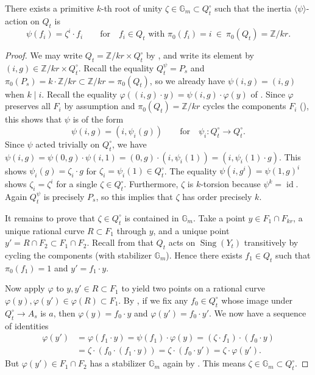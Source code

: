 \documentclass[reqno, letterpaper]{amsart}
\numberwithin{equation}{subsection}
\let\to\longrightarrow
\newcommand{\GG}{\mathbb{G}}
\newcommand{\ZZ}{\mathbb{Z}}
\DeclareMathOperator{\id}{id}
\DeclareMathOperator{\Sing}{Sing}
\begin{document}
			\begin{lemma} \label{lem:classification of multiple fiber iii:psi-action}
				There exists a primitive $k$-th root of unity $\zeta \in \GG_m \subset Q_t^\circ$ such that the inertia $\langle \psi \rangle$-action on $Q_t$ is
				\[ \psi(f_i) = \zeta^i \cdot f_i \qquad\mbox{for}\quad f_i \in Q_t \mbox{ with } \pi_0(f_i) = i \ \in \ \pi_0(Q_t) = \ZZ/kr .\]
			\end{lemma}
			\begin{proof}
				We may write $Q_t = \ZZ/kr \times Q_t^\circ$ by , and write its element by $(i, g) \in \ZZ/kr \times Q_t^\circ$. Recall the equality $Q_t^\psi = P_s$ and $\pi_0(P_s) = k \cdot \ZZ/kr \subset \ZZ/kr = \pi_0(Q_t)$, so we already have $\psi(i,g) = (i,g)$ when $k \mid i$. Recall the equality $\varphi ((i,g) \cdot y) = \psi(i,g) \cdot \varphi(y)$ of . Since $\varphi$ preserves all $F_i$ by assumption and $\pi_0(Q_t) = \ZZ/kr$ cycles the components $F_i$ (), this shows that $\psi$ is of the form
				\[ \psi(i,g) = (i, \psi_i (g)) \qquad\mbox{for}\quad \psi_i : Q_t^\circ \to Q_t^\circ .\]
				Since $\psi$ acted trivially on $Q_t^\circ$, we have $\psi(i,g) = \psi(0,g) \cdot \psi(i,1) = (0,g) \cdot (i,\psi_i(1)) = (i, \psi_i(1) \cdot g)$. This shows $\psi_i(g) = \zeta_i \cdot g$ for $\zeta_i = \psi_i(1) \in Q_t^\circ$. The equality $\psi(i,g^i) = \psi(1, g)^i$ shows $\zeta_i = \zeta^i$ for a single $\zeta \in Q_t^\circ$. Furthermore, $\zeta$ is $k$-torsion because $\psi^k = \id$. Again $Q_t^\psi$ is precisely $P_s$, so this implies that $\zeta$ has order precisely $k$.
				
				\medskip
				
				It remains to prove that $\zeta \in Q_t^\circ$ is contained in $\GG_m$. Take a point $y \in F_1 \cap F_{kr}$, a unique rational curve $R \subset F_1$ through $y$, and a unique point $y' = R \cap F_2 \subset F_1 \cap F_2$. Recall from  that $Q_t$ acts on $\Sing(Y_t)$ transitively by cycling the components (with stabilizer $\GG_m$). Hence there exists $f_1 \in Q_t$ such that $\pi_0(f_1) = 1$ and $y' = f_1 \cdot y$.
				
				Now apply $\varphi$ to $y, y' \in R \subset F_1$ to yield two points on a rational curve $\varphi(y), \varphi(y') \in \varphi(R) \subset F_1$. By , if we fix any $f_0 \in Q_t^\circ$ whose image under $Q_t^\circ \to A_s$ is $a$, then $\varphi(y) = f_0 \cdot y$ and $\varphi(y') = f_0 \cdot y'$. We now have a sequence of identities
				\begin{align*}
					\varphi(y') &= \varphi(f_1 \cdot y) = \psi(f_1) \cdot \varphi(y) = (\zeta \cdot f_1) \cdot (f_0 \cdot y) \\
					&= \zeta \cdot (f_0 \cdot (f_1 \cdot y)) = \zeta \cdot (f_0 \cdot y') = \zeta \cdot \varphi(y') .
				\end{align*}
				But $\varphi(y') \in F_1 \cap F_2$ has a stabilizer $\GG_m$ again by . This means $\zeta \in \GG_m \subset Q_t^\circ$.
			\end{proof}
			
\end{document}
